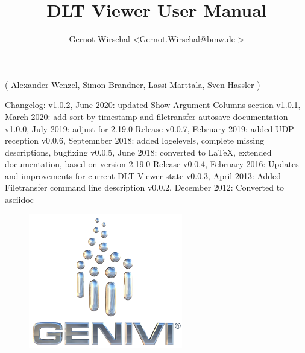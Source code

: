 \documentclass[a4paper,11pt]{article}
\begin{document}
\title{DLT Viewer User Manual}
\author{Gernot Wirschal \textless Gernot.Wirschal@bmw.de \textgreater }


\maketitle

\begin{center}
( Alexander Wenzel, Simon Brandner, Lassi Marttala, Sven Hassler ) \linebreak
\end{center}

Changelog:\linebreak
v1.0.2, June 2020: updated Show Argument Columns section
v1.0.1, March 2020: add sort by timestamp and filetransfer autosave documentation\linebreak
v1.0.0, July 2019: adjust for 2.19.0 Release\linebreak
v0.0.7, February 2019: added UDP reception\linebreak
v0.0.6, Septemnber 2018: added logelevels, complete missing descriptions, bugfixing \linebreak
v0.0.5, June 2018: converted to \LaTeX, extended documentation, based on version 2.19.0 Release \linebreak
v0.0.4, February 2016: Updates and improvements for current DLT Viewer state \linebreak
v0.0.3, April 2013: Added Filetransfer command line description \linebreak
v0.0.2, December 2012: Converted to asciidoc \linebreak

\vspace{3cm}

\begin{figure}[h]
    \centering
    \includegraphics[width=0.6\textwidth]{images/genivi_transparent.png}
\end{figure}
\end{document}
